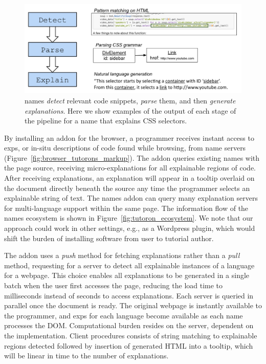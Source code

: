 \begin{figure}
\centering
    \includegraphics[width=\columnwidth]{figures/explanation_pipeline}
    \caption{\Glspl{name} \emph{detect} relevant code snippets, \emph{parse} them, and then \emph{generate explanations}.  Here we show examples of the output of each stage of the pipeline for a \gls{name} that explains CSS selectors.}
    \label{fig:explanation_pipeline}
\end{figure}
\fi

By installing an addon for the browser, a programmer receives instant access to \glspl{exp}, or in-situ descriptions of code found while browsing, from \gls{name} servers (Figure~\ref{fig:browser_tutorons_markup}).
The addon queries existing \glspl{name} with the page source, receiving micro-explanations for all explainable regions of code.
After receiving explanations, an explanation will appear in a tooltip overlaid on the document directly beneath the source any time the programmer selects an explainable string of text.
The \Glspl{name} addon can query many explanation servers for multi-language support within the same page.
The information flow of the \Glspl{name} ecosystem is shown in Figure~\ref{fig:tutoron_ecosystem}.
We note that our approach could work in other settings, e.g., as a Wordpress plugin, which would shift the burden of installing software from user to tutorial author.

The addon uses a \emph{push} method for fetching explanations rather than a \emph{pull} method, requesting for a server to detect all explainable instances of a language for a webpage.
This choice enables all explanations to be generated in a single batch when the user first accesses the page, reducing the load time to milliseconds instead of seconds to access explanations.
Each server is queried in parallel once the document is ready.
The original webpage is instantly available to the programmer, and \glspl{exp} for each language become available as each \gls{name} processes the DOM.
Computational burden resides on the server, dependent on the implementation.
Client procedures consists of string matching to explainable regions detected followed by insertion of generated HTML into a tooltip, which will be linear in time to the number of explanations.

